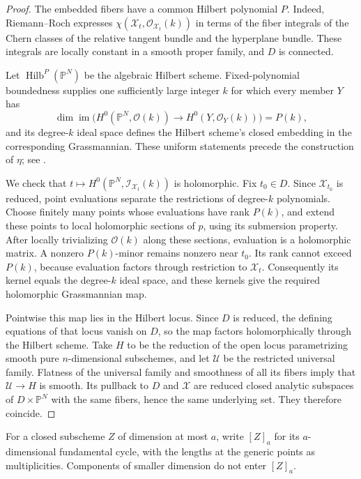 \begin{proof}
The embedded fibers have a common Hilbert polynomial $P$.
Indeed, Riemann--Roch expresses
$\chi(\mathcal X_t,\mathcal O_{\mathcal X_t}(k))$ in terms of the
fiber integrals of the Chern classes of the relative tangent bundle and
the hyperplane bundle.  These integrals are locally constant in a smooth
proper family, and $D$ is connected.

Let $\operatorname{Hilb}^{P}(\mathbb P^N)$ be the algebraic Hilbert scheme.
Fixed-polynomial boundedness supplies one sufficiently large integer $k$
for which every member $Y$ has
\[
 \dim \operatorname{im}\bigl(H^0(\mathbb P^N,\mathcal O(k))
       \longrightarrow H^0(Y,\mathcal O_Y(k))\bigr)=P(k),
\]
and its degree-$k$ ideal space defines the Hilbert scheme's closed
embedding in the corresponding Grassmannian.  These uniform statements
precede the construction of $\eta$; see
\cite[Theorem~3.2 and Proposition~3.8]{GrothendieckHilbert}.

We check that $t\mapsto H^0(\mathbb P^N,\mathcal I_{\mathcal X_t}(k))$
is holomorphic.  Fix $t_0\in D$.  Since $\mathcal X_{t_0}$ is reduced,
point evaluations separate the restrictions of degree-$k$ polynomials.
Choose finitely many points whose evaluations have rank $P(k)$, and
extend these points to local holomorphic sections of $p$, using its
submersion property.  After locally trivializing $\mathcal O(k)$ along
these sections, evaluation is a holomorphic matrix.  A nonzero
$P(k)$-minor remains nonzero near $t_0$.  Its rank cannot exceed $P(k)$,
because evaluation factors through restriction to $\mathcal X_t$.
Consequently its kernel equals the degree-$k$ ideal space, and these
kernels give the required holomorphic Grassmannian map.

Pointwise this map lies in the Hilbert locus.  Since $D$ is reduced,
the defining equations of that locus vanish on $D$, so the map factors
holomorphically through the Hilbert scheme.  Take $H$ to be the reduction
of the open locus parametrizing smooth pure $n$-dimensional subschemes,
and let $\mathcal U$ be the restricted universal family.  Flatness of the
universal family and smoothness of all its fibers imply that
$\mathcal U\to H$ is smooth.  Its pullback to $D$ and $\mathcal X$
are reduced closed analytic subspaces of $D\times\mathbb P^N$ with the
same fibers, hence the same underlying set.  They therefore coincide.
\end{proof}

For a closed subscheme $Z$ of dimension at most $a$, write
$[Z]_a$ for its $a$-dimensional fundamental cycle, with the lengths at
the generic points as multiplicities.  Components of smaller dimension
do not enter $[Z]_a$.

